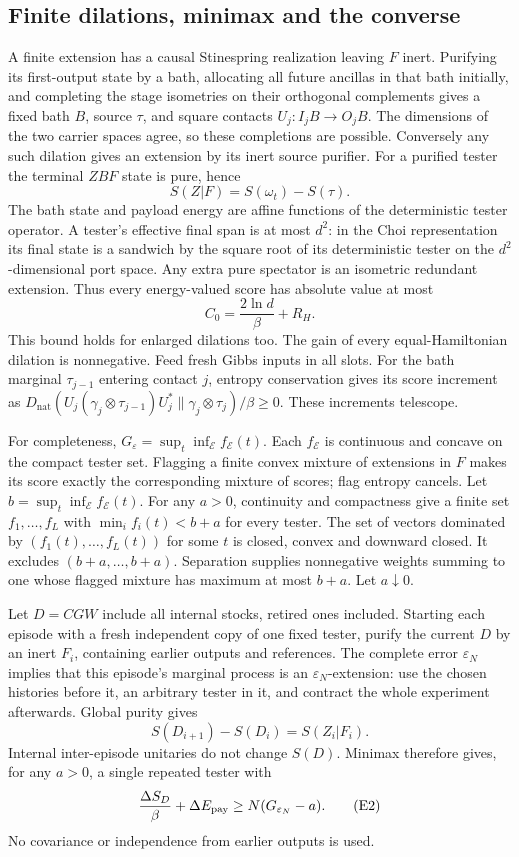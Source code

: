 \documentclass[11pt]{article}
\theoremstyle{definition}
\theoremstyle{remark}
\providecommand{\D}{D_{\mathrm{nat}}}
\begin{document}
\subsection{Finite dilations, minimax and the converse}
A finite extension has a causal Stinespring realization leaving \(F\)
inert. Purifying its first-output state by a bath, allocating all future
ancillas in that bath initially, and completing the stage isometries on
their orthogonal complements gives a fixed bath \(B\), source \(\tau\),
and square contacts \(U_j:I_jB\to O_jB\). The dimensions of the two
carrier spaces agree, so these completions are possible. Conversely any
such dilation gives an extension by its inert source purifier.
For a purified tester the terminal \(ZBF\) state is pure, hence
\[
 S(Z|F)=S(\omega_t)-S(\tau).
\]
The bath state and payload energy are affine functions of the deterministic
tester operator. A tester's effective final span is at most \(d^2\):
in the Choi representation its final state is a sandwich by the square
root of its deterministic tester on the \(d^2\)-dimensional port space.
Any extra pure spectator is an isometric redundant extension. Thus every
energy-valued score has absolute value at most
\[
 C_0=\frac{2\ln d}{\beta}+R_H.                         \tag{E1}
\]
This bound holds for enlarged dilations too.
The gain of every equal-Hamiltonian dilation is nonnegative. Feed fresh Gibbs
inputs in all slots. For the bath marginal \(\tau_{j-1}\) entering
contact \(j\), entropy conservation gives its score increment as
\(\D(U_j(\gamma_j\otimes\tau_{j-1})U_j^*
\|\gamma_j\otimes\tau_j)/\beta\ge0\). These increments telescope.

For completeness, \(G_\varepsilon=\sup_t\inf_{\mathcal E}f_{\mathcal E}(t)\).
Each \(f_{\mathcal E}\) is continuous and concave on the compact tester
set. Flagging a finite convex mixture of extensions in \(F\) makes its
score exactly the corresponding mixture of scores; flag entropy cancels.
Let \(b=\sup_t\inf_{\mathcal E}f_{\mathcal E}(t)\). For any \(a>0\),
continuity and compactness give a finite set \(f_1,\ldots,f_L\) with
\(\min_i f_i(t)<b+a\) for every tester. The set of vectors dominated by
\((f_1(t),\ldots,f_L(t))\) for some \(t\) is closed, convex and downward
closed. It excludes \((b+a,\ldots,b+a)\). Separation supplies nonnegative
weights summing to one whose flagged mixture has maximum at most \(b+a\).
Let \(a\downarrow0\).

Let \(D=CGW\) include all internal stocks, retired ones included. Starting
each episode with a fresh independent copy of one fixed tester, purify
the current \(D\) by an inert \(F_i\), containing earlier outputs and
references. The complete error \(\varepsilon_N\) implies that this
episode's marginal process is an \(\varepsilon_N\)-extension: use the
chosen histories before it, an arbitrary tester in it, and contract the
whole experiment afterwards. Global purity gives
\[
 S(D_{i+1})-S(D_i)=S(Z_i|F_i).
\]
Internal inter-episode unitaries do not change \(S(D)\). Minimax therefore
gives, for any \(a>0\), a single repeated tester with
\[
 \frac{\Delta S_D}{\beta}+\Delta E_{\rm pay}
 \ge N(G_{\varepsilon_N}-a).                         \tag{E2}
\]
No covariance or independence from earlier outputs is used.
\end{document}
